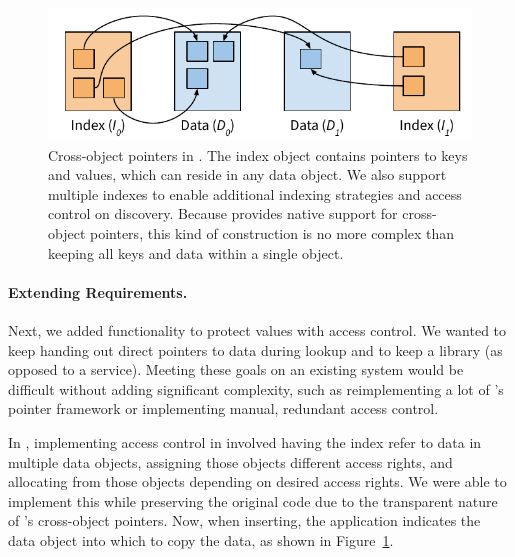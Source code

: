 {    \begin{figure}
        \centering
        \includegraphics[width=\linewidth]{fig/twzkv}
        \caption{Cross-object pointers in \nvkv. The index object contains pointers to keys and values,
            which can reside in any data object. We also support multiple indexes to enable additional
            indexing strategies and access control on discovery. Because \Twizzler provides native support
            for cross-object pointers, this kind of construction is no more complex than keeping all keys
            and data within a single object.}
        \label{fig:twzkv}
    \end{figure}




    \paragraph{Extending Requirements.}

    Next, we added functionality to protect values with access control. We wanted to
    keep handing out direct pointers to data during lookup and to
    keep \nvkv a library (as opposed to a service). Meeting these goals on an
    existing system would be difficult without adding significant
    complexity, such as reimplementing a lot of \Twizzler's pointer framework or implementing manual,
    redundant access control.

    In \Twizzler, implementing access control in \nvkv involved having the index refer to data in
    multiple data objects, assigning those objects different access rights, and allocating from
    those objects depending on desired access rights. We were
    able to implement this while preserving the original code due to the
    transparent nature of \Twizzler's cross-object pointers. Now, when inserting, the application
    indicates the data object into which to copy the data, as shown in Figure~\ref{fig:twzkv}.

}
